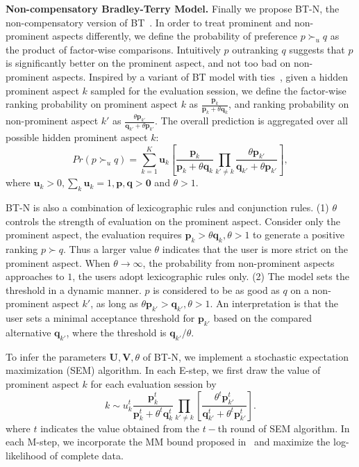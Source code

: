 \documentclass[letterpaper]{article} %
\begin{document}
\textbf{Non-compensatory Bradley-Terry Model.} Finally we propose BT-N, the non-compensatory version of BT~\cite{Hu2016Improved}. In order to treat prominent and non-prominent aspects differently, we define the probability of preference $p\succ_u q$ as the product of factor-wise comparisons. Intuitively $p$ outranking $q$ suggests that $p$ is significantly better on the prominent aspect, and not too bad on non-prominent aspects. Inspired by a variant of BT model with ties~\cite{Hunter2004MM}, given a hidden prominent aspect $k$ sampled for the evaluation session, we define the factor-wise ranking probability on prominent aspect $k$ as ${\frac{\mathbf{p}_k}{\mathbf{p}_k+\theta \mathbf{q}_k}}$, and ranking probability on non-prominent aspect $k'$ as $ \frac{\theta \mathbf{p}_{k'}}{\mathbf{q}_{k'}+\theta \mathbf{p}_{k'}}$. The overall prediction is aggregated over all possible hidden prominent aspect $k$:
\begin{equation}\label{equ:BT-N}
Pr(p\succ_u q)  =  \sum_{k=1}^{K} \mathbf{u}_k [ {\frac{\mathbf{p}_k}{\mathbf{p}_k+\theta \mathbf{q}_k}}\prod_{k'\neq k}{ \frac{\theta \mathbf{p}_{k'}}{\mathbf{q}_{k'}+\theta \mathbf{p}_{k'}}}],
\end{equation}
where $\mathbf{u}_k >0, \sum_k \mathbf{u}_k=1,\mathbf{p,q}>\mathbf{0}$ and $\theta>1$.  

BT-N is also a combination of lexicographic rules and conjunction rules. (1) $\theta$ controls the strength of evaluation on the prominent aspect. Consider only the prominent aspect, the evaluation requires $\mathbf{p}_{k} > \theta \mathbf{q}_{k}, \theta>1$ to generate a positive ranking $p\succ q$. Thus a larger value $\theta$ indicates that the user is more strict on the prominent aspect. When $\theta \rightarrow \infty$, the probability from non-prominent aspects  approaches to $1$, the users adopt lexicographic rules only. (2) The model sets the threshold in a dynamic manner. $p$ is considered to be as good as $q$ on a non-prominent aspect $k'$, as long as $\theta \mathbf{p}_{k'} >  \mathbf{q}_{k'},\theta>1$.  An interpretation is that the user sets a minimal acceptance threshold for $\mathbf{p}_{k'}$ based on the compared alternative $\mathbf{q}_{k'}$, where the threshold is $\mathbf{q}_{k'}/\theta$.  

To infer the parameters $\mathbf{U},\mathbf{V},\theta$ of BT-N, we implement a stochastic expectation maximization (SEM) algorithm. In each E-step, we first draw the value of prominent aspect $k$ for each evaluation session by
 \begin{equation}
 k \sim u_k^{t} \frac{\mathbf{p}_{k}^t} {\mathbf{p}_{k}^t+\theta^t \mathbf{q}_{k}^t} \prod_{k'\neq k}  [\frac{\theta^t \mathbf{p}_{k'}^t} {\mathbf{q}_{k'}^t + \theta^t \mathbf{p}_{k'}^t}].
 \end{equation}
 where $t$ indicates the value obtained from the $t-$th round of SEM algorithm.
 In each M-step, we incorporate the MM bound proposed in~\cite{Hunter2004MM} and maximize the log-likelihood of complete data. 
\end{document}
